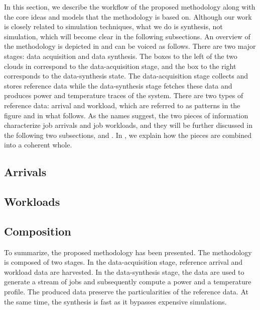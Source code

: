 In this section, we describe the workflow of the proposed methodology along with
the core ideas and models that the methodology is based on. Although our work is
closely related to simulation techniques, what we do is synthesis, not
simulation, which will become clear in the following subsections. An overview of
the methodology is depicted in  and can be voiced as follows.
There are two major stages: data acquisition and data synthesis. The boxes to
the left of the two clouds in  correspond to the
data-acquisition stage, and the box to the right corresponds to the
data-synthesis state. The data-acquisition stage collects and stores reference
data while the data-synthesis stage fetches these data and produces power and
temperature traces of the system. There are two types of reference data: arrival
and workload, which are referred to as patterns in the figure and in what
follows. As the names suggest, the two pieces of information characterize job
arrivals and job workloads, and they will be further discussed in the following
two subsections,  and . In , we
explain how the pieces are combined into a coherent whole.

\subsection{Arrivals} 


\subsection{Workloads} 


\subsection{Composition} 


To summarize, the proposed methodology has been presented. The methodology is
composed of two stages. In the data-acquisition stage, reference arrival and
workload data are harvested. In the data-synthesis stage, the data are used to
generate a stream of jobs and subsequently compute a power and a temperature
profile. The produced data preserve the particularities of the reference data.
At the same time, the synthesis is fast as it bypasses expensive simulations.
